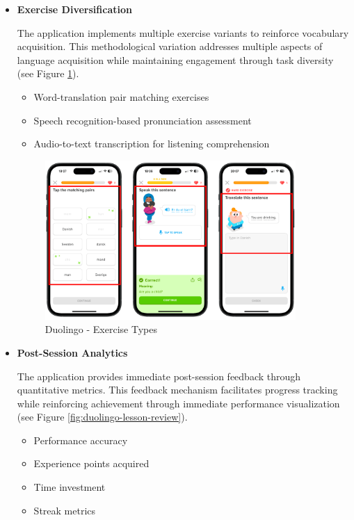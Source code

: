 \begin{itemize}
    \item \textbf{Exercise Diversification}

    The application implements multiple exercise variants to reinforce vocabulary acquisition. This methodological variation addresses multiple aspects of language acquisition while maintaining engagement through task diversity (see Figure \ref{fig:duolingo-exercise-types}).

    \begin{itemize}
        \item Word-translation pair matching exercises
        \item Speech recognition-based pronunciation assessment
        \item Audio-to-text transcription for listening comprehension
    \end{itemize}

    \begin{figure}[!h]
        \includegraphics[width=0.9\textwidth]{src/figures/duolingo-exercise-types.png}
        \caption{Duolingo - Exercise Types}
        \label{fig:duolingo-exercise-types}
    \end{figure}
    \newpage
    \item \textbf{Post-Session Analytics}
    \label{sec:duolingo-lesson-review}

    The application provides immediate post-session feedback through quantitative metrics. This feedback mechanism facilitates progress tracking while reinforcing achievement through immediate performance visualization (see Figure \ref{fig:duolingo-lesson-review}).
    
    \begin{itemize}
        \item Performance accuracy
        \item Experience points acquired
        \item Time investment
        \item Streak metrics
    \end{itemize}


\end{itemize}
